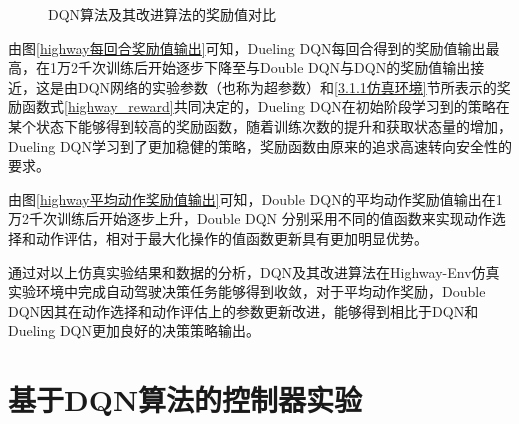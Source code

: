 \begin{figure}[htbp]
    \vspace{13pt}
    \centering
    \caption{DQN算法及其改进算法的奖励值对比}\label{DQN算法及其改进算法的奖励值对比} 
\end{figure}

由图\ref{highway每回合奖励值输出}可知，Dueling DQN每回合得到的奖励值输出最高，在1万2千次训练后开始逐步下降至与Double DQN与DQN的奖励值输出接近，这是由DQN网络的实验参数（也称为超参数）和\ref{3.1.1仿真环境}节所表示的奖励函数式\ref{highway_reward}共同决定的，Dueling DQN在初始阶段学习到的策略在某个状态下能够得到较高的奖励函数，随着训练次数的提升和获取状态量的增加，Dueling DQN学习到了更加稳健的策略，奖励函数由原来的追求高速转向安全性的要求。

由图\ref{highway平均动作奖励值输出}可知，Double DQN的平均动作奖励值输出在1万2千次训练后开始逐步上升，Double DQN 分别采用不同的值函数来实现动作选择和动作评估，相对于最大化操作的值函数更新具有更加明显优势。

通过对以上仿真实验结果和数据的分析，DQN及其改进算法在Highway-Env仿真实验环境中完成自动驾驶决策任务能够得到收敛，对于平均动作奖励，Double DQN因其在动作选择和动作评估上的参数更新改进，能够得到相比于DQN和Dueling DQN更加良好的决策策略输出。

\section{基于DQN算法的控制器实验}\label{基于DQN算法的控制器实验}

